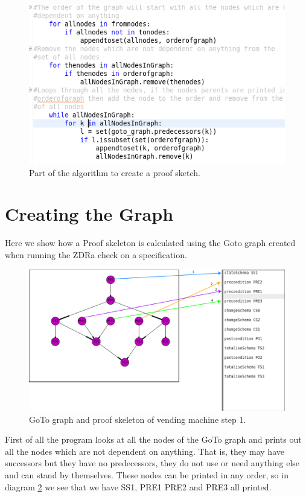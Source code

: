 \begin{figure}[H]
\includegraphics[scale=0.5]{Figures/skeleton/code.png}
\caption{Part of the algorithm to create a proof sketch.}
\label{fig:code}
\end{figure}

\section{Creating the Graph}

Here we show how a Proof skeleton is calculated using the Goto graph created when running the ZDRa check on a specification.

\begin{figure}[H]
\includegraphics[scale=0.3]{Figures/skeleton/1.png}
\caption{GoTo graph and proof skeleton of vending machine step 1.}
\label{fig:1}
\end{figure}

First of all the program looks at all the nodes of the GoTo graph and prints out all the nodes which are not dependent on anything. That is, they may have successors but they have no predecessors, they do not use or need anything else and can stand by themselves. These nodes can be printed in any order, so in diagram \ref{fig:1} we see that we have SS1, PRE1 PRE2 and PRE3 all printed.

